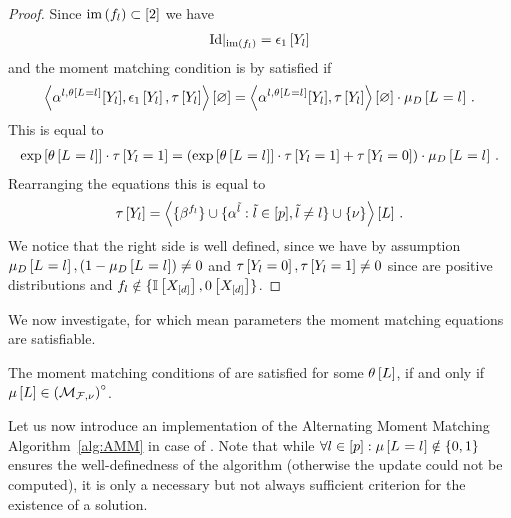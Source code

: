 \begin{proof}
    Since $\mathrm{im}\left(f_{l}\right)\subset[2]$ we have
    \begin{align*}
        {\mathrm{Id}}|_{\mathrm{im}\left(f_{l}\right)} = \epsilon_{1}\left[Y_{l}\right]
    \end{align*}
    and the moment matching condition is by  satisfied if
    \begin{align*}
        \left\langle \alpha^{l,\theta\left[L_{}=l_{}\right]}[Y_{l}], \epsilon_{1}\left[Y_{l}\right], \tau\left[Y_{l}\right]\right\rangle \left[ \varnothing \right]
        = \left\langle \alpha^{l,\theta\left[L_{}=l_{}\right]}[Y_{l}],\tau\left[Y_{l}\right]\right\rangle \left[ \varnothing \right] \cdot \mu_{D}\left[L_{}=l_{}\right] \, .
    \end{align*}
    This is equal to
    \begin{align*}
        \mathrm{exp}\left[\theta\left[L_{}=l_{}\right]\right] \cdot \tau\left[Y_{l}=1\right]
        = \left( \mathrm{exp}\left[\theta\left[L_{}=l_{}\right]\right] \cdot \tau\left[Y_{l}=1\right] + \tau\left[Y_{l}=0\right] \right) \cdot \mu_{D}\left[L_{}=l_{}\right] \, .
    \end{align*}
    Rearranging the equations this is equal to
    \begin{align*}
        \tau\left[Y_{l}\right]
        = \left\langle \{\beta^{f_{l}}\}
        \cup\{\alpha^{\tilde{l}} : \tilde{l} \in [p], \tilde{l}\neq l\}
        \cup\{\nu\}\right\rangle \left[ L \right] \, .
    \end{align*}
    We notice that the right side is well defined, since we have by assumption $\mu_{D}\left[L_{}=l_{}\right], (1- \mu_{D}\left[L_{}=l_{}\right]) \neq 0$ and $\tau\left[Y_{l}=0\right], \tau\left[Y_{l}=1\right] \neq 0$ since \MarkovLogicNetworks{} are positive distributions and $f_{l} \notin \{\mathbb{I}\left[X_{[d]}\right],0\left[X_{[d]}\right]\}$.
\end{proof}

We now investigate, for which mean parameters the moment matching equations are satisfiable.

\begin{lemma}
    The moment matching conditions of  are satisfied for some $\theta\left[L\right]$, if and only if $\mu\left[L\right]\in{\left(\mathcal{M}_{\mathcal{F},\nu}\right)}^{\circ}$.
\end{lemma}


Let us now introduce an implementation of the Alternating Moment Matching Algorithm~\ref{alg:AMM} in case of \MarkovLogicNetworks{}.
Note that while $\forall{l\in[p]}:{\mu\left[L_{}=l_{}\right]\notin\{0,1\}}$ ensures the well-definedness of the algorithm (otherwise the update could not be computed), it is only a necessary but not always sufficient criterion for the existence of a solution.


